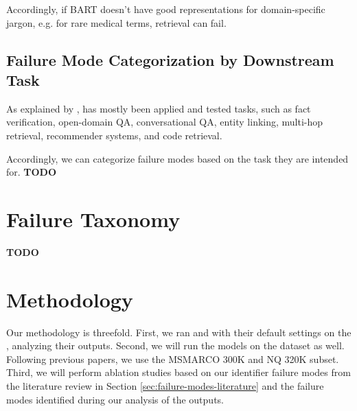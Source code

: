 Accordingly, if BART doesn't have good representations for domain-specific jargon, e.g. for rare medical terms, retrieval can fail. 

\subsection{Failure Mode Categorization by Downstream Task}

As explained by \citet{xiaoxi-li-from-matching},  has mostly been applied and tested  \cite{petroni-kilt-a} tasks, such as fact verification, open-domain QA, conversational QA, entity linking, multi-hop retrieval, recommender systems, and code retrieval. %

Accordingly, we can categorize failure modes based on the  task they are intended for. \textbf{TODO}

\section{Failure Taxonomy}
\label{sec:proposed-failure-taxonomy}
\label{tab:failure-summary}
\textbf{TODO}

\section{Methodology}

Our methodology is threefold. First, we ran  and  with their default settings on the  \cite{kwiatkowski-natural-questions}, analyzing their outputs. Second, we will run the models on the  dataset \cite{payal-bajaj-ms-marco} as well. Following previous papers, we use the MSMARCO 300K and NQ 320K subset. %
Third, we will perform ablation studies based on our identifier failure modes from the literature review  in Section \ref{sec:failure-modes-literature} and the failure modes identified during our analysis of the outputs. %

